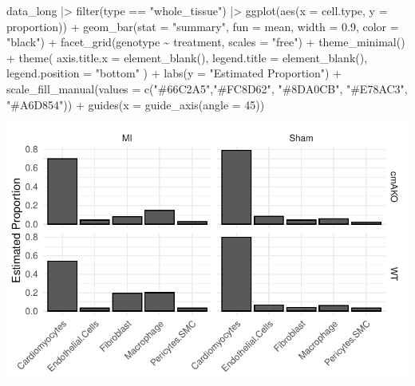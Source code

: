 \documentclass[
  letterpaper,
  DIV=11,
  numbers=noendperiod]{scrreprt}
\newenvironment{Shaded}{\begin{snugshade}}{\end{snugshade}}
\newcommand{\AttributeTok}[1]{\textcolor[rgb]{0.40,0.45,0.13}{#1}}
\newcommand{\DecValTok}[1]{\textcolor[rgb]{0.68,0.00,0.00}{#1}}
\newcommand{\FloatTok}[1]{\textcolor[rgb]{0.68,0.00,0.00}{#1}}
\newcommand{\FunctionTok}[1]{\textcolor[rgb]{0.28,0.35,0.67}{#1}}
\newcommand{\NormalTok}[1]{\textcolor[rgb]{0.00,0.23,0.31}{#1}}
\newcommand{\SpecialCharTok}[1]{\textcolor[rgb]{0.37,0.37,0.37}{#1}}
\newcommand{\StringTok}[1]{\textcolor[rgb]{0.13,0.47,0.30}{#1}}
\begin{document}
\begin{Shaded}
\begin{Highlighting}[]
\NormalTok{data\_long   }\SpecialCharTok{|\textgreater{}} 
  \FunctionTok{filter}\NormalTok{(type }\SpecialCharTok{==} \StringTok{"whole\_tissue"}\NormalTok{) }\SpecialCharTok{|\textgreater{}} 
  \FunctionTok{ggplot}\NormalTok{(}\FunctionTok{aes}\NormalTok{(}\AttributeTok{x =}\NormalTok{ cell.type, }\AttributeTok{y =}\NormalTok{ proportion)) }\SpecialCharTok{+}
  \FunctionTok{geom\_bar}\NormalTok{(}\AttributeTok{stat =} \StringTok{"summary"}\NormalTok{, }\AttributeTok{fun =}\NormalTok{ mean, }\AttributeTok{width =} \FloatTok{0.9}\NormalTok{,  }\AttributeTok{color =} \StringTok{"black"}\NormalTok{) }\SpecialCharTok{+}
  \FunctionTok{facet\_grid}\NormalTok{(genotype }\SpecialCharTok{\textasciitilde{}}\NormalTok{ treatment, }\AttributeTok{scales =} \StringTok{"free"}\NormalTok{) }\SpecialCharTok{+} 
  \FunctionTok{theme\_minimal}\NormalTok{() }\SpecialCharTok{+}
  \FunctionTok{theme}\NormalTok{(}
    \AttributeTok{axis.title.x =} \FunctionTok{element\_blank}\NormalTok{(), }
    \AttributeTok{legend.title =} \FunctionTok{element\_blank}\NormalTok{(),}
    \AttributeTok{legend.position =} \StringTok{"bottom"}
\NormalTok{  ) }\SpecialCharTok{+}
  \FunctionTok{labs}\NormalTok{(}\AttributeTok{y =} \StringTok{"Estimated Proportion"}\NormalTok{) }\SpecialCharTok{+}
  \FunctionTok{scale\_fill\_manual}\NormalTok{(}\AttributeTok{values =} \FunctionTok{c}\NormalTok{(}\StringTok{"\#66C2A5"}\NormalTok{,}\StringTok{"\#FC8D62"}\NormalTok{, }\StringTok{"\#8DA0CB"}\NormalTok{, }\StringTok{"\#E78AC3"}\NormalTok{, }\StringTok{"\#A6D854"}\NormalTok{)) }\SpecialCharTok{+}
  \FunctionTok{guides}\NormalTok{(}\AttributeTok{x =} \FunctionTok{guide\_axis}\NormalTok{(}\AttributeTok{angle =} \DecValTok{45}\NormalTok{))}
\end{Highlighting}
\end{Shaded}

\includegraphics{scripts/03_dataWrangling/class6_files/figure-pdf/unnamed-chunk-13-1.pdf}
\end{document}
